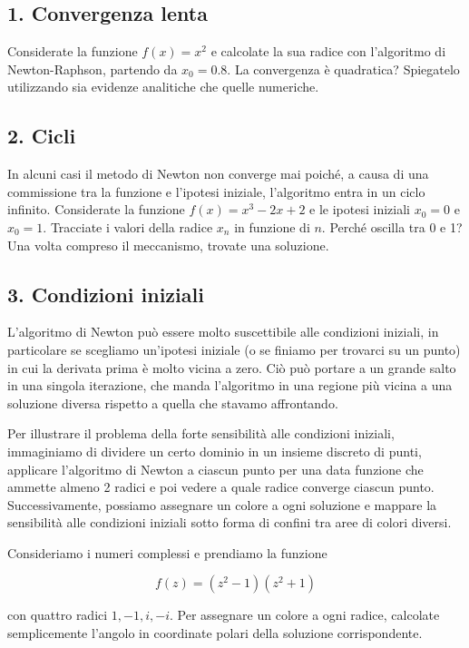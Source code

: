 \subsection*{1. Convergenza lenta}
Considerate la funzione $f(x) = x^2$ e calcolate la sua radice con l'algoritmo di Newton-Raphson, partendo da $x_0 = 0.8$. La convergenza è quadratica? Spiegatelo utilizzando sia evidenze analitiche che quelle numeriche.

\subsection*{2. Cicli}
In alcuni casi il metodo di Newton non converge mai poiché, a causa di una commissione tra la funzione e l'ipotesi iniziale, l'algoritmo entra in un ciclo infinito. Considerate la funzione $f(x) = x^3 - 2x + 2$ e le ipotesi iniziali $x_0 = 0$ e $x_0 = 1$. Tracciate i valori della radice $x_n$ in funzione di $n$. Perché oscilla tra 0 e 1? Una volta compreso il meccanismo, trovate una soluzione.

\subsection*{3. Condizioni iniziali}
L'algoritmo di Newton può essere molto suscettibile alle condizioni iniziali, in particolare se scegliamo un'ipotesi iniziale (o se finiamo per trovarci su un punto) in cui la derivata prima è molto vicina a zero. Ciò può portare a un grande salto in una singola iterazione, che manda l'algoritmo in una regione più vicina a una soluzione diversa rispetto a quella che stavamo affrontando.

\medskip

Per illustrare il problema della forte sensibilità alle condizioni iniziali, immaginiamo di dividere un certo dominio in un insieme discreto di punti, applicare l'algoritmo di Newton a ciascun punto per una data funzione che ammette almeno 2 radici e poi vedere a quale radice converge ciascun punto. Successivamente, possiamo assegnare un colore a ogni soluzione e mappare la sensibilità alle condizioni iniziali sotto forma di confini tra aree di colori diversi.

Consideriamo i numeri complessi e prendiamo la funzione

$$f(z) = (z^2 - 1)(z^2 + 1)$$

con quattro radici $1, -1, i, -i$. Per assegnare un colore a ogni radice, calcolate semplicemente l'angolo in coordinate polari della soluzione corrispondente.

